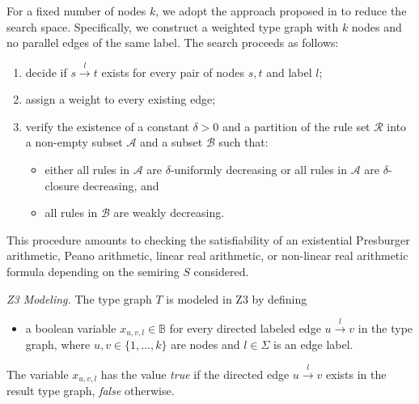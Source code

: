 For a fixed number of nodes $k$, we adopt the approach proposed in \cite{bruggink2015proving, bruggink2014termination,zantema2014termination} to reduce the search space. Specifically, we construct a weighted type graph with
$k$ nodes and no parallel edges of the same label.
The search proceeds as follows: 
\begin{enumerate}
    \item decide if $s \overset{l}{\to} t$ exists for every pair of nodes \( s, t\) and label \( l\);
    \item assign a weight to every existing edge;
    \item verify the existence of a constant $\delta >0$ and a partition of the rule set $\mathcal{R}$ into a non-empty subset $\mathcal{A}$ and a subset $\mathcal{B}$
 such that:
    \begin{itemize}
        \item either all rules in $\mathcal{A}$ are $\delta$-uniformly decreasing or all rules in $\mathcal{A}$ are $\delta$-closure decreasing, and
        \item all rules in $\mathcal{B}$ are weakly decreasing.
    \end{itemize}
\end{enumerate}


This procedure amounts to checking the satisfiability of an existential Presburger arithmetic, Peano arithmetic, linear real arithmetic, or non-linear real arithmetic formula depending on the semiring $S$ considered.

\emph{Z3 Modeling.}
The type graph $T$ is modeled in Z3 by defining 
\begin{itemize}
    \item a boolean variable $x_{u,v,l} \in \mathbb{B}$ for every directed labeled edge $u\overset{l}{\to} v$ in the type graph, where $u,v\in\{1,...,k\}$ are nodes and $l \in \Sigma$ is an edge label.
\end{itemize}  
The variable $x_{u,v,l}$ has the value \textit{true} if the directed edge $u\overset{l}{\to} v$ exists in the result type graph, \textit{false} otherwise. 

